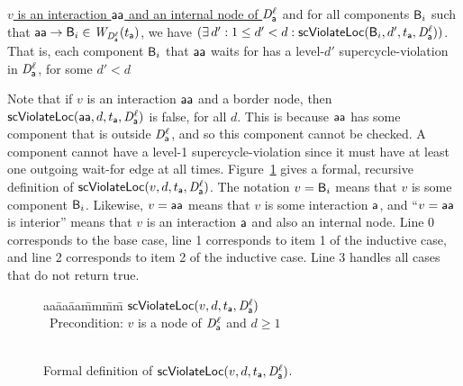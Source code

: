 \item \ul{$v$ is an interaction $\mathsf{aa}$ and an internal node of $\mathit{D}_{\mathsf{a}}^{\ell}$} and
    for all components $\mathsf{B}_i$ such that $\mathsf{aa} \rightarrow \mathsf{B}_i \in \mathit{W}_{\mathit{D}_{\mathsf{a}}^{\ell}}({t_{\mathsf{a}}})$, we have 
    $(\exists\, d' : 1 \le d' < d : \mathsf{scViolateLoc}(\mathsf{B}_i,d',t_{\mathsf{a}},\mathit{D}_{\mathsf{a}}^{\ell}))$.
    That is, each component $\mathsf{B}_i$ that $\mathsf{aa}$ waits for has a level-$d'$ supercycle-violation in $\mathit{D}_{\mathsf{a}}^{\ell}$, for some $d' < d$

\en
\ed
%
Note that if $v$ is an interaction $\mathsf{aa}$ and a border node, then
$\mathsf{scViolateLoc}(\mathsf{aa},d,t_{\mathsf{a}},\mathit{D}_{\mathsf{a}}^{\ell})$ is false, for all $d$.  This is because $\mathsf{aa}$ has some
component that is outside $\mathit{D}_{\mathsf{a}}^{\ell}$, and so this component cannot be checked.  A component
cannot have a level-1 supercycle-violation since it must
have at least one outgoing wait-for edge at all times.
%
Figure~\ref{fig:scViolateLoc} gives a formal, recursive definition of $\mathsf{scViolateLoc}(v,d,t_{\mathsf{a}},\mathit{D}_{\mathsf{a}}^{\ell})$.
The notation $v = \mathsf{B}_i$ means that $v$ is some component $\mathsf{B}_i$. Likewise, 
$v = \mathsf{aa}$ means that $v$ is some interaction $\mathsf{a}$, and 
``$v = \mathsf{aa}$ is interior'' means that  $v$ is an interaction $\mathsf{a}$ and also an internal node.
Line 0 corresponds to the base case, line 1 corresponds to item 1 of the inductive case, and line 2 corresponds to item 2 of the inductive case.
Line 3 handles all cases that do not return true.

\begin{figure}[ht]
\setcounter{lctr}{-1}
\begin{tabbing}
aa\= aa\= aa\= mm\= mm\=\kill
$\mathsf{scViolateLoc}(v,d,t_{\mathsf{a}},\mathit{D}_{\mathsf{a}}^{\ell})$\\
\cmnt\ Precondition: $v$ is a node of $\mathit{D}_{\mathsf{a}}^{\ell}$ and $d \ge 1$\\
    \>\>{\RETURNE{\ttt};}\\ 
\lio{\RETURNE{\fff}}
\end{tabbing}
\vspace{-6ex}
\caption{Formal definition of $\mathsf{scViolateLoc}(v,d,t_{\mathsf{a}},\mathit{D}_{\mathsf{a}}^{\ell})$.}
\label{fig:scViolateLoc}
\end{figure}





